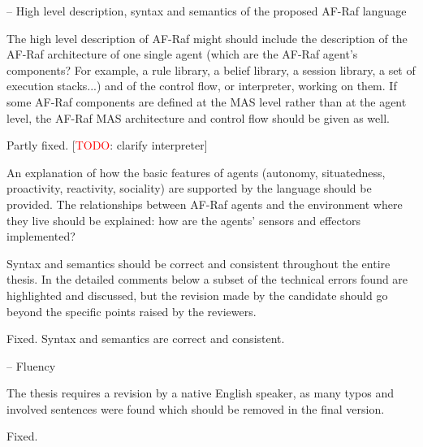 \documentclass{article}
\newcommand{\todo}[1]{[\textcolor{red}{TODO}: #1]}
\newenvironment{them}{\noindent\begingroup\color{blue}}{\endgroup\par}
\begin{document}
\begin{them}
-- High level description, syntax and semantics of the proposed AF-Raf language

The high level description of AF-Raf might should include the description of the AF-Raf architecture of one single agent (which are the AF-Raf agent's components? For example, a rule library, a belief library, a session library, a set of execution stacks...) and of the control flow, or interpreter, working on them. If some AF-Raf components are defined at the MAS level rather than at the agent level, the AF-Raf MAS architecture and control flow should be given as well.
\end{them}
Partly fixed.
\todo{clarify interpreter}

\begin{them}
An explanation of how the basic features of agents (autonomy, situatedness, proactivity, reactivity, sociality) are supported by the language should be provided. The relationships between AF-Raf agents and the environment where they live should be explained: how are the agents' sensors and effectors implemented? 
\end{them}
\todo{clarify this}

\begin{them}
Syntax and semantics should be correct and consistent throughout the entire thesis. In the detailed comments below a subset of the technical errors found are highlighted and discussed, but the revision made by the candidate should go beyond the specific points raised by the reviewers.
\end{them}
Fixed. Syntax and semantics are correct and consistent.

\begin{them}
-- Fluency

The thesis requires a revision by a native English speaker, as many typos and involved sentences were found which should be removed in the final version.
\end{them}
Fixed.
\end{document}
